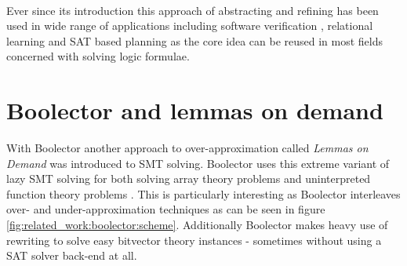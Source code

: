 \paragraph{}
Ever since its introduction this approach of abstracting and refining has been used in wide range of applications including software verification \cite{CEGAR}, relational learning \cite{CEGAR-Relational-Learning} and SAT based planning \cite{CEGAR-Planning} as the core idea can be reused in most fields concerned with solving logic formulae.



\section{Boolector and lemmas on demand}
\label{par:related_work:boolector}
With Boolector \cite{Brummayer-Biere2009_Chapter_BoolectorAnEfficientSMTSolverF} another approach to over-approximation called \textit{Lemmas on Demand} was introduced to SMT solving. Boolector uses this extreme variant of lazy SMT solving for both solving array theory problems \cite{p6-brummayer} and uninterpreted function theory problems \cite{NiemetzPreinerBiere-FMCAD14}.
This is particularly interesting as Boolector interleaves over- and under-approximation techniques as can be seen in figure \ref{fig:related_work:boolector:scheme}.
Additionally Boolector makes heavy use of rewriting to solve easy bitvector theory instances - sometimes without using a SAT solver back-end at all.
